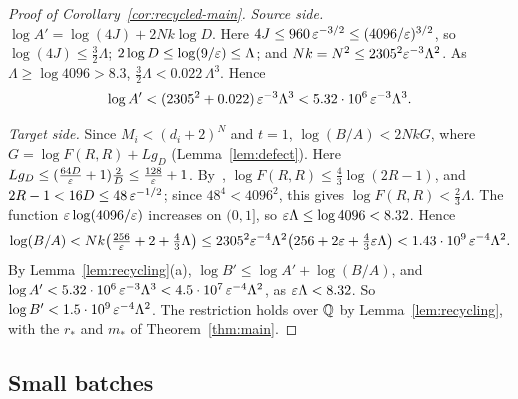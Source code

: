 \begin{proof}[Proof of Corollary~\ref{cor:recycled-main}]
\emph{Source side.} \(\log A'=\log(4J)+2Nk\log D\). Here
\(4J\le960\,\varepsilon^{-3/2}\le(4096/\varepsilon)^{3/2}\), so
\(\log(4J)\le\frac32\Lambda\); \(2\log D\le\log(9/\varepsilon)\le\Lambda\); and
\(Nk=N^2\le2305^2\varepsilon^{-3}\Lambda^2\). As \(\Lambda\ge\log4096>8.3\),
\(\frac32\Lambda<0.022\,\Lambda^3\). Hence
\[
 \log A'<(2305^2+0.022)\,\varepsilon^{-3}\Lambda^3<5.32\cdot10^6\,\varepsilon^{-3}\Lambda^3 .
\]

\emph{Target side.} Since \(M_i<(d_i+2)^N\) and \(t=1\),
\(\log(B/A)<2NkG\), where \(G=\log F(R,R)+Lg_D\)
(Lemma~\ref{lem:defect}). Here \(Lg_D\le(\frac{64D}{\varepsilon}+1)\frac2D\le\frac{128}{\varepsilon}+1\).
By~\citep[(3.6)]{FinCon26}, \(\log F(R,R)\le\frac43\log(2R-1)\), and
\(2R-1<16D\le48\,\varepsilon^{-1/2}\); since \(48^4<4096^2\), this gives
\(\log F(R,R)<\frac23\Lambda\). The function \(\varepsilon\log(4096/\varepsilon)\)
increases on \((0,1]\), so \(\varepsilon\Lambda\le\log4096<8.32\). Hence
\[
 \log(B/A)<Nk\bigl(\tfrac{256}{\varepsilon}+2+\tfrac43\Lambda\bigr)
 \le2305^2\varepsilon^{-4}\Lambda^2\bigl(256+2\varepsilon+\tfrac43\varepsilon\Lambda\bigr)
 <1.43\cdot10^9\,\varepsilon^{-4}\Lambda^2 .
\]
By Lemma~\ref{lem:recycling}(a), \(\log B'\le\log A'+\log(B/A)\), and
\(\log A'<5.32\cdot10^6\,\varepsilon^{-3}\Lambda^3<4.5\cdot10^7\,\varepsilon^{-4}\Lambda^2\),
as \(\varepsilon\Lambda<8.32\). So
\(\log B'<1.5\cdot10^9\,\varepsilon^{-4}\Lambda^2\).
The restriction holds over \(\mathbb Q\) by Lemma~\ref{lem:recycling}, with the
\(r_*\) and \(m_*\) of Theorem~\ref{thm:main}.
\end{proof}

\subsection{Small batches}
\label{subsec:lower-small-proof}

